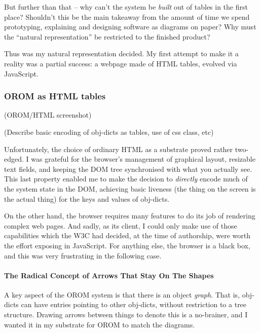 \documentclass[english,submission]{programming}
\begin{document}
But further than that -- why can't the system be \emph{built} out of
tables in the first place? Shouldn't this be the main takeaway from the
amount of time we spend prototyping, explaining and designing software
as diagrams on paper? Why must the ``natural representation'' be
restricted to the finished product?

Thus was my natural representation decided. My first attempt to make it
a reality was a partial success: a webpage made of HTML tables, evolved
via JavaScript.

\hypertarget{orom-as-html-tables}{%
\subsubsection{OROM as HTML tables}\label{orom-as-html-tables}}

(OROM/HTML screenshot)

(Describe basic encoding of obj-dicts as tables, use of css class, etc)

Unfortunately, the choice of ordinary HTML as a substrate proved rather
two-edged. I was grateful for the browser's management of graphical
layout, resizable text fields, and keeping the DOM tree synchronised
with what you actually see. This last property enabled me to make the
decision to \emph{directly} encode much of the system state in the DOM,
achieving basic liveness (the thing on the screen is the actual thing)
for the keys and values of obj-dicts.

On the other hand, the browser requires many features to do its job of
rendering complex web pages. And sadly, as its client, I could only make
use of those capabilities which the W3C had decided, at the time of
authorship, were worth the effort exposing in JavaScript. For anything
else, the browser is a black box, and this was very frustrating in the
following case.

\hypertarget{the-radical-concept-of-arrows-that-stay-on-the-shapes}{%
\paragraph{The Radical Concept of Arrows That Stay On The
Shapes}\label{the-radical-concept-of-arrows-that-stay-on-the-shapes}}

A key aspect of the OROM system is that there is an object \emph{graph}.
That is, obj-dicts can have entries pointing to other obj-dicts, without
restriction to a tree structure. Drawing arrows between things to denote
this is a no-brainer, and I wanted it in my substrate for OROM to match
the diagrams.
\end{document}
